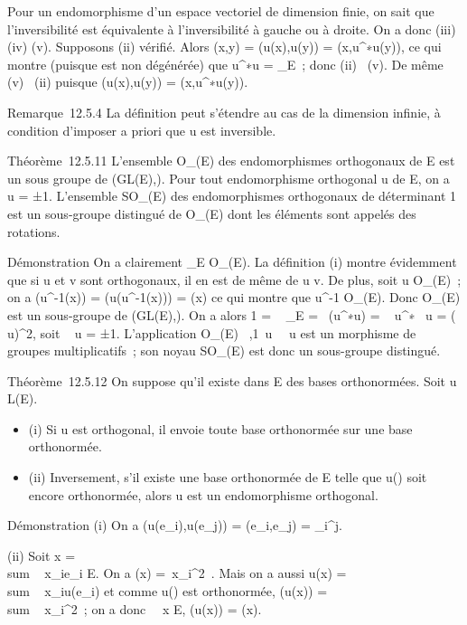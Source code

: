 \documentclass[]{article}
\begin{document}
Pour un endomorphisme d'un espace vectoriel de dimension finie, on sait
que l'inversibilité est équivalente à l'inversibilité à gauche ou à
droite. On a donc (iii) \Leftrightarrow (iv)
\Leftrightarrow (v). Supposons (ii) vérifié. Alors \phi(x,y) =
\phi(u(x),u(y)) = \phi(x,u^∗\cdot u(y)), ce qui montre (puisque \phi est
non dégénérée) que u^∗\cdot u =
\mathrmId_E~; donc (ii) \rigtharrow~(v). De même (v)
\rigtharrow~(ii) puisque \phi(u(x),u(y)) = \phi(x,u^∗\cdot u(y)).

Remarque~12.5.4 La définition peut s'étendre au cas de la dimension
infinie, à condition d'imposer a priori que u est inversible.

Théorème~12.5.11 L'ensemble O_\Phi(E) des endomorphismes
orthogonaux de E est un sous groupe de (GL(E),\cdot). Pour tout
endomorphisme orthogonal u de E, on a
~ u = ±1.
L'ensemble SO_\Phi(E) des endomorphismes orthogonaux de
déterminant 1 est un sous-groupe distingué de O_\Phi(E) dont les
éléments sont appelés des rotations.

Démonstration On a clairement \mathrmId_E \in
O_\Phi(E). La définition (i) montre évidemment que si u et v sont
orthogonaux, il en est de même de u \cdot v. De plus, soit u \in
O_\Phi(E)~; on a \Phi(u^-1(x)) = \Phi(u(u^-1(x)))
= \Phi(x) ce qui montre que u^-1 \in O_\Phi(E). Donc
O_\Phi(E) est un sous-groupe de (GL(E),\cdot). On a alors 1
= ~
\mathrmId_E =\
 (u^∗\cdot u)
= ~
u^∗~ u
= (~
u)^2, soit
\mathrm{det}~ u = ±1.
L'application O_\Phi(E) \rightarrow~,1\,
u\mapsto~~
u est un morphisme de groupes multiplicatifs~; son noyau
SO_\Phi(E) est donc un sous-groupe distingué.

Théorème~12.5.12 On suppose qu'il existe dans E des bases orthonormées.
Soit u \in L(E).

\begin{itemize}
\itemsep1pt\parskip0pt
\item
  (i) Si u est orthogonal, il envoie toute base orthonormée sur une base
  orthonormée.
\item
  (ii) Inversement, s'il existe une base orthonormée  de E telle que
  u(\mathcal{E}) soit encore orthonormée, alors u est un endomorphisme orthogonal.
\end{itemize}

Démonstration (i) On a \phi(u(e_i),u(e_j)) =
\phi(e_i,e_j) = \delta_i^j.

(ii) Soit x = \\sum ~
x_ie_i \in E. On a \Phi(x) =\
\sum  x_i^2~. Mais on a aussi
u(x) = \\sum ~
x_iu(e_i) et comme u() est orthonormée, \Phi(u(x))
= \\sum ~
x_i^2~; on a donc \forall~~x \in E,
\Phi(u(x)) = \Phi(x).
\end{document}
